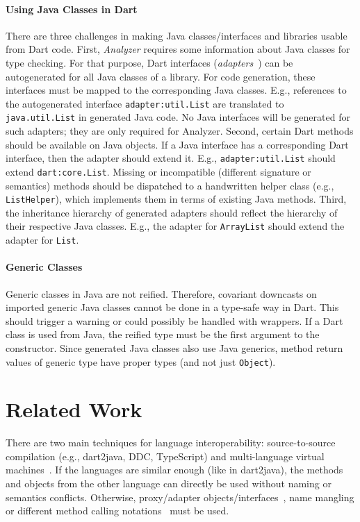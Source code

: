 \documentclass[sigplan]{acmart}
\begin{document}
\paragraph{Using Java Classes in Dart}
There are three challenges in making Java classes/interfaces and libraries usable from Dart code. First, \emph{Analyzer} requires some information about Java classes for type checking. For that purpose, Dart interfaces (\emph{adapters}~\cite{Gamma:1995:DPE:186897}) can be autogenerated for all Java classes of a library. For code generation, these interfaces must be mapped to the corresponding Java classes. E.g., references to the autogenerated interface \texttt{adapter:util.List} are translated to \texttt{java.util.List} in generated Java code. No Java interfaces will be generated for such adapters; they are only required for Analyzer. Second, certain Dart methods should be available on Java objects. If a Java interface has a corresponding Dart interface, then the adapter should extend it. E.g., \texttt{adapter:util.List} should extend \texttt{dart:core.List}. Missing or incompatible (different signature or semantics) methods should be dispatched to a handwritten helper class (e.g., \texttt{ListHelper}), which implements them in terms of existing Java methods. Third, the inheritance hierarchy of generated adapters should reflect the hierarchy of their respective Java classes. E.g., the adapter for \texttt{ArrayList} should extend the adapter for \texttt{List}.

\paragraph{Generic Classes}
Generic classes in Java are not reified. Therefore, covariant downcasts on imported generic Java classes cannot be done in a type-safe way in Dart. This should trigger a warning or could possibly be handled with wrappers. If a Dart class is used from Java, the reified type must be the first argument to the constructor. Since generated Java classes also use Java generics, method return values of generic type have proper types (and not just \texttt{Object}).


\section{Related Work}
There are two main techniques for language interoperability: source-to-source compilation (e.g., dart2java, DDC, TypeScript) and multi-language virtual machines~\cite{multivm_saarlang, vranythesis}. If the languages are similar enough (like in dart2java), the methods and objects from the other language can directly be used without naming or semantics conflicts. Otherwise, proxy/adapter objects/interfaces~\cite{DBLP:journals/jot/EkmanMS07}, name mangling or different method calling notations~\cite{DBLP:journals/corr/Springer16} must be used. 
\end{document}
